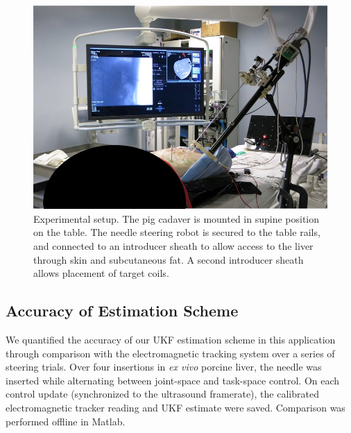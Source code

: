 \begin{figure}[!t]
\centering
\includegraphics[width = \columnwidth]{./Images/Chapter5/CadaverSetup/CadaverSetup.jpg}%
\caption[Experimental setup for pre-clinical needle steering]{Experimental setup. The pig cadaver is mounted in supine position on the table. The needle steering robot is secured to the table rails, and connected to an introducer sheath to allow access to the liver through skin and subcutaneous fat. A second introducer sheath allows placement of target coils.}
\label{fig:CadaverSetup}
\end{figure}  

\subsection{Accuracy of Estimation Scheme}
We quantified the accuracy of our UKF estimation scheme in this application through comparison with the electromagnetic tracking system over a series of steering trials. Over four insertions in \textit{ex vivo} porcine liver, the needle was inserted while alternating between joint-space and task-space control. On each control update (synchronized to the ultrasound framerate), the calibrated electromagnetic tracker reading and UKF estimate were saved. Comparison was performed offline in Matlab.


